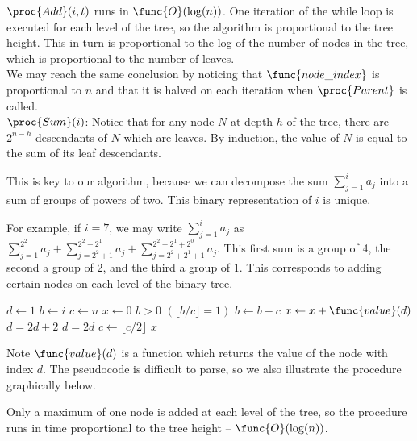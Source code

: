\documentclass[11pt, answers]{exam}
\theoremstyle{plain}
\theoremstyle{definition}
\begin{document}
\begin{questions}
\begin{parts}
\begin{solution}
$\proc{Add}(i,t)$ runs in $\func{O}(\log(n))$. One iteration of the while loop is executed for each level of the tree, so the algorithm is proportional to the tree height. This in turn is proportional to the log of the number of nodes in the tree, which is proportional to the number of leaves. \\

We may reach the same conclusion by noticing that $\func{node\_index}$ is proportional to $n$ and that it is halved on each iteration when $\proc{Parent}$ is called.
\\

$\proc{Sum}(i)$:
Notice that for any node $N$ at depth $h$ of the tree, there are $2^{n-h}$ descendants of $N$ which are leaves. By induction, the value of $N$ is equal to the sum of its leaf descendants. 

This is key to our algorithm, because we can decompose the sum $\sum_{j=1}^{i}a_j$ into a sum of groups of powers of two. This binary representation of $i$ is unique.

For example, if $i=7$, we may write $\sum_{j=1}^{i}a_j$ as $\sum_{j=1}^{2^2}a_j +\sum_{j=2^2 + 1}^{2^2 + 2^1}a_j + \sum_{j=2^2 + 2^1 + 1}^{2^2 + 2^1 + 2^0}a_j$. This first sum is a group of 4, the second a group of 2, and the third a group of 1. This corresponds to adding certain nodes on each level of the binary tree.

\begin{codebox}
\li $d \gets 1$
\li $b \gets i$
\li $c \gets n$
\li $x \gets 0$
\li \While $b > 0$ \Do
\li		\If $(\lfloor b / c \rfloor = 1)$ \Then
\li 		$b \gets b - c$
\li			$x \gets x + \func{value}(d)$
\li 		$d = 2d + 2$
\li		\Else
\li			$d = 2d$	
		\End
\li	$c \gets \lfloor c / 2 \rfloor$ 		
	\End
\li \Return $x$
\end{codebox}

Note $\func{value}(d)$ is a function which returns the value of the node with index $d$. The pseudocode is difficult to parse, so we also illustrate the procedure graphically below. 

Only a maximum of one node is added at each level of the tree, so the procedure runs in time proportional to the tree height -- $\func{O}(\log(n))$.

\begin{minipage}[t]{\linewidth}
                \centering
\begin{tikzpicture}
[ 
level distance=9mm, 
every node/.style={circle, draw, inner sep=1.5pt},
level 1/.style={sibling distance=30mm}, 
level 2/.style={sibling distance=17mm}, 
level 3/.style={sibling distance=7mm}
]


\end{tikzpicture}
\end{minipage}
\end{solution}
\end{parts}
\end{questions}
\end{document}
